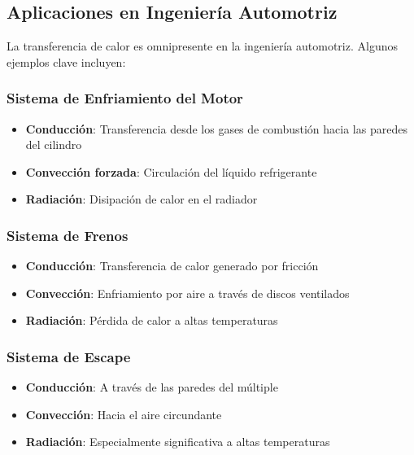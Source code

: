 \documentclass{article}
\begin{document}
    \subsection{Aplicaciones en Ingeniería Automotriz}

    La transferencia de calor es omnipresente en la ingeniería automotriz. Algunos ejemplos clave incluyen:

    \subsubsection{Sistema de Enfriamiento del Motor}
    \begin{itemize}
        \item \textbf{Conducción}: Transferencia desde los gases de combustión hacia las paredes del cilindro
        \item \textbf{Convección forzada}: Circulación del líquido refrigerante
        \item \textbf{Radiación}: Disipación de calor en el radiador
    \end{itemize}

    \subsubsection{Sistema de Frenos}
    \begin{itemize}
        \item \textbf{Conducción}: Transferencia de calor generado por fricción
        \item \textbf{Convección}: Enfriamiento por aire a través de discos ventilados
        \item \textbf{Radiación}: Pérdida de calor a altas temperaturas
    \end{itemize}

    \subsubsection{Sistema de Escape}
    \begin{itemize}
        \item \textbf{Conducción}: A través de las paredes del múltiple
        \item \textbf{Convección}: Hacia el aire circundante
        \item \textbf{Radiación}: Especialmente significativa a altas temperaturas
    \end{itemize}
\end{document}
